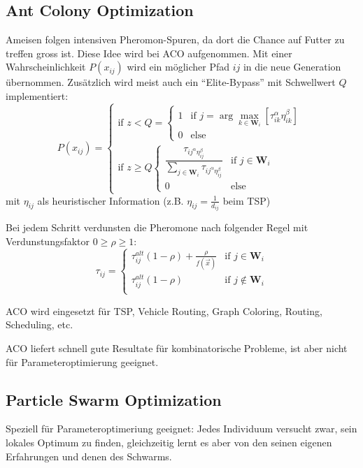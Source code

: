   
  \subsection{Ant Colony Optimization }
  Ameisen folgen intensiven Pheromon-Spuren, da dort die Chance auf Futter zu treffen gross ist. Diese Idee wird bei ACO aufgenommen. Mit einer Wahrscheinlichkeit $P(x_{ij})$ wird ein möglicher Pfad $ij$ in die neue Generation übernommen. Zusätzlich wird meist auch ein "`Elite-Bypass"' mit Schwellwert $Q$ implementiert:
  $$P(x_{ij}) = 
  \begin{cases}
    \text{if } z < Q = 
    \begin{cases}
      1 & \text{if } j = \arg \max\limits_{k \in \mathbf{W}_i}[\tau_{ik}^\alpha \eta_{ik}^\beta] \\
      0 & \text{else}
    \end{cases} \\
    \text{if } z \geq Q
    \begin{cases}
      \dfrac{\tau_{ij^\alpha \eta_{ij}^\beta}}{\sum\limits_{j \in \mathbf{W}_i} \tau_{ij^\alpha \eta_{ij}^\beta}}  & \text{if }j \in \mathbf{W}_i\\
      0 & \text{else}
    \end{cases}
  \end{cases}$$
  mit $\eta_{ij}$ als heuristischer Information (z.B. $\eta_{ij} = \frac{1}{d_{ij}}$ beim TSP)
  
  Bei jedem Schritt verdunsten die Pheromone nach folgender Regel mit Verdunstungsfaktor $0 \geq \rho \geq 1$:
  $$\tau_{ij} = \begin{cases}
    \tau_{ij}^{alt} (1-\rho) + \frac{\rho}{f(\vec{x})} & \text{if } j \in \mathbf{W}_i\\
    \tau_{ij}^{alt} (1-\rho) & \text{if } j \notin \mathbf{W}_i\\
  \end{cases}$$
  
  ACO wird eingesetzt für TSP, Vehicle Routing, Graph Coloring, Routing, Scheduling, etc.
  
  ACO liefert schnell gute Resultate für kombinatorische Probleme, ist aber nicht für Parameteroptimierung geeignet.\\
  
  
  
\subsection{Particle Swarm Optimization }
  Speziell für Parameteroptimeriung geeignet: Jedes Individuum versucht zwar, sein lokales Optimum zu finden, gleichzeitig lernt es aber von den seinen eigenen Erfahrungen und denen des Schwarms.
  

